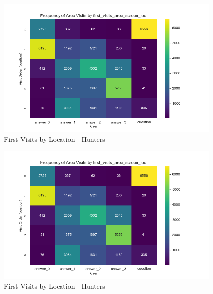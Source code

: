 \documentclass{article}
\begin{document}
\begin{figure}[H]
    \centering
    \includegraphics[width=1\linewidth]{plots/matrix_first_visits_first_visits_area_screen_loc_hunters.png}
    \caption{First Visits by Location - Hunters}
    \label{fig:sl_h}
\end{figure}

\begin{figure}[H]
    \centering
    \includegraphics[width=1\linewidth]{plots/matrix_first_visits_first_visits_area_screen_loc_hunters.png}
    \caption{First Visits by Location - Hunters}
    \label{fig:sl_h}
\end{figure}
\end{document}
